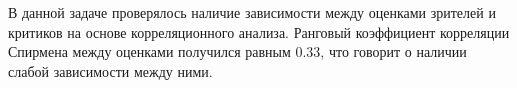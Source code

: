 В данной задаче проверялось наличие зависимости между оценками зрителей и критиков на основе корреляционного анализа. Ранговый коэффициент корреляции Спирмена между оценками получился равным 0.33, что говорит о наличии слабой зависимости между ними. 



